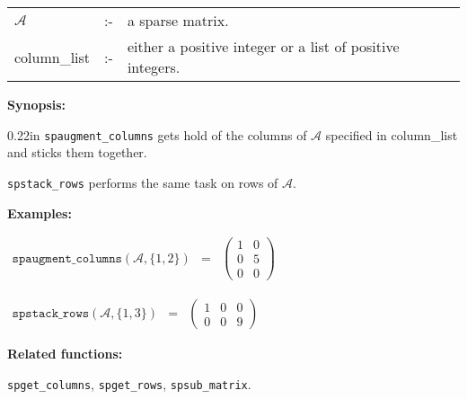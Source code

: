 \hspace*{0.1in}
\begin{tabular}{l l l}
$\mathcal{A}$  &:-& a sparse matrix. \\
column\_list &:-&  either a positive integer or a list of positive 
                   integers. 
\end{tabular}

\textbf{Synopsis:} 

\begin{addtolength}{\leftskip}{0.22in}
\texttt{spaugment\_columns} gets hold of the columns of $\mathcal{A}$ specified 
in column\_list and sticks them together. 

\texttt{spstack\_rows} performs the same task on rows of 
                $\mathcal{A}$.

\end{addtolength}

\textbf{Examples:}

\begin{flushleft}  
\hspace*{0.1in}
\begin{math}
\begin{array}{ccc}
\texttt{spaugment\_columns}(\mathcal{A},\{1,2\}) & = & 
\left( \begin{array}{cc} 1 & 0 \\ 0 & 5 \\ 0 & 0  
\end{array} \right)  
\end{array}
\end{math}  
\end{flushleft}

\vspace*{0.1in}

\begin{flushleft}  
\hspace*{0.1in}
\begin{math}  
\begin{array}{ccc}
\texttt{spstack\_rows}(\mathcal{A},\{1,3\}) & = & 
\left( \begin{array}{ccc} 1 & 0 & 0 \\ 0 & 0 & 9
\end{array} \right)  
\end{array}  
\end{math}
\end{flushleft}

\textbf{Related functions:}

\hspace*{0.175in} \texttt{spget\_columns}, \texttt{spget\_rows}, 
\texttt{spsub\_matrix}.


